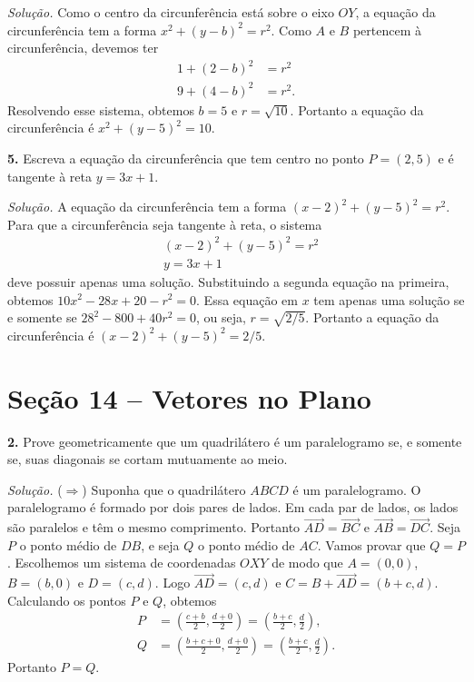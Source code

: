 \documentclass[a4paper,11pt]{article}
\begin{document}
\vspace{\baselineskip}

\emph{Solução.}
Como o centro da circunferência está sobre o eixo $OY$, a equação da circunferência tem a forma $x^2 + (y-b)^2 = r^2$.
Como $A$ e $B$ pertencem à circunferência, devemos ter
\begin{align*}
  1 + (2 - b)^2 & = r^2 \\
  9 + (4 - b)^2 & = r^2.
\end{align*}
Resolvendo esse sistema, obtemos $b = 5$ e $r = \sqrt{10}$.
Portanto a equação da circunferência é $x^2 + (y - 5)^2 = 10$.

\vspace{\baselineskip}

\textbf{5.}
Escreva a equação da circunferência que tem centro no ponto $P = (2,5)$ e é tangente à reta $y = 3x + 1$.

\vspace{\baselineskip}

\emph{Solução.}
A equação da circunferência tem a forma $(x-2)^2 + (y-5)^2 = r^2$.
Para que a circunferência seja tangente à reta, o sistema
\begin{align*}
  & (x-2)^2 + (y-5)^2 = r^2 \\
  & y = 3x + 1
\end{align*}
deve possuir apenas uma solução.
Substituindo a segunda equação na primeira, obtemos $10x^2 - 28x + 20-r^2 = 0$.
Essa equação em $x$ tem apenas uma solução se e somente se $28^2 - 800 + 40r^2 = 0$, ou seja, $r = \sqrt{2/5}$.
Portanto a equação da circunferência é $(x-2)^2 + (y-5)^2 = 2/5$.

\section*{Seção 14 -- Vetores no Plano}

\textbf{2.}
Prove geometricamente que um quadrilátero é um paralelogramo se, e somente se, suas diagonais se cortam mutuamente ao meio.

\vspace{\baselineskip}

\emph{Solução.}
($\Rightarrow$)
Suponha que o quadrilátero $ABCD$ é um paralelogramo.
O paralelogramo é formado por dois pares de lados.
Em cada par de lados, os lados são paralelos e têm o mesmo comprimento.
Portanto $\overrightarrow{AD} = \overrightarrow{BC}$ e $\overrightarrow{AB} = \overrightarrow{DC}$.
Seja $P$ o ponto médio de $DB$, e seja $Q$ o ponto médio de $AC$.
Vamos provar que $Q = P$.
Escolhemos um sistema de coordenadas $OXY$ de modo que $A = (0,0)$, $B = (b,0)$ e $D = (c, d)$.
Logo $\overrightarrow{AD} = (c,d)$ e $C = B + \overrightarrow{AD} = (b + c, d)$.
Calculando os pontos $P$ e $Q$, obtemos
\begin{align*}
  P & = \left( \frac{c+b}{2}, \frac{d+0}{2} \right) = \left( \frac{b+c}{2}, \frac{d}{2} \right), \\
  Q & = \left( \frac{b + c + 0}{2}, \frac{d+0}{2} \right) = \left( \frac{b+c}{2}, \frac{d}{2} \right).
\end{align*}
Portanto $P = Q$.
\end{document}
